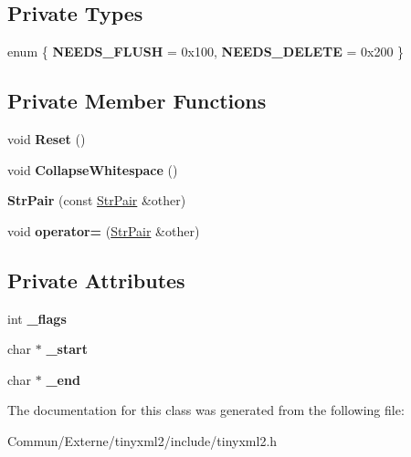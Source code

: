 \subsection*{Private Types}
\begin{DoxyCompactItemize}
\item 
enum \{ {\bfseries N\+E\+E\+D\+S\+\_\+\+F\+L\+U\+SH} = 0x100, 
{\bfseries N\+E\+E\+D\+S\+\_\+\+D\+E\+L\+E\+TE} = 0x200
 \}\hypertarget{classtinyxml2_1_1_str_pair_a085d6d2619f1ee0def75e2764dc9551c}{}\label{classtinyxml2_1_1_str_pair_a085d6d2619f1ee0def75e2764dc9551c}

\end{DoxyCompactItemize}
\subsection*{Private Member Functions}
\begin{DoxyCompactItemize}
\item 
void {\bfseries Reset} ()\hypertarget{classtinyxml2_1_1_str_pair_a80c1b3bd99bf62ae85c94a29ce537125}{}\label{classtinyxml2_1_1_str_pair_a80c1b3bd99bf62ae85c94a29ce537125}

\item 
void {\bfseries Collapse\+Whitespace} ()\hypertarget{classtinyxml2_1_1_str_pair_ade1469025e6b4cac74397a82a7429337}{}\label{classtinyxml2_1_1_str_pair_ade1469025e6b4cac74397a82a7429337}

\item 
{\bfseries Str\+Pair} (const \hyperlink{classtinyxml2_1_1_str_pair}{Str\+Pair} \&other)\hypertarget{classtinyxml2_1_1_str_pair_ac43c1f4a5730c5582f9cff724376d106}{}\label{classtinyxml2_1_1_str_pair_ac43c1f4a5730c5582f9cff724376d106}

\item 
void {\bfseries operator=} (\hyperlink{classtinyxml2_1_1_str_pair}{Str\+Pair} \&other)\hypertarget{classtinyxml2_1_1_str_pair_a0f095caeacc0b1fd9fee55cd71261ab4}{}\label{classtinyxml2_1_1_str_pair_a0f095caeacc0b1fd9fee55cd71261ab4}

\end{DoxyCompactItemize}
\subsection*{Private Attributes}
\begin{DoxyCompactItemize}
\item 
int {\bfseries \+\_\+flags}\hypertarget{classtinyxml2_1_1_str_pair_ae6fabc08e7b24b0d41fa5f2fadbda4ed}{}\label{classtinyxml2_1_1_str_pair_ae6fabc08e7b24b0d41fa5f2fadbda4ed}

\item 
char $\ast$ {\bfseries \+\_\+start}\hypertarget{classtinyxml2_1_1_str_pair_acfd8687916a02833cc55c279460d2f4a}{}\label{classtinyxml2_1_1_str_pair_acfd8687916a02833cc55c279460d2f4a}

\item 
char $\ast$ {\bfseries \+\_\+end}\hypertarget{classtinyxml2_1_1_str_pair_a855c81f785458d8f84313221f2d4a1eb}{}\label{classtinyxml2_1_1_str_pair_a855c81f785458d8f84313221f2d4a1eb}

\end{DoxyCompactItemize}


The documentation for this class was generated from the following file\+:\begin{DoxyCompactItemize}
\item 
Commun/\+Externe/tinyxml2/include/tinyxml2.\+h\end{DoxyCompactItemize}
